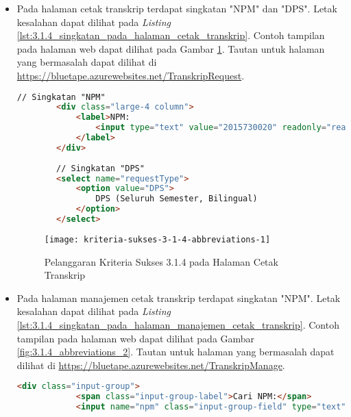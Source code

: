 \begin{itemize}
    \item Pada halaman cetak transkrip terdapat singkatan "NPM" dan "DPS". Letak kesalahan dapat dilihat pada \textit{Listing} \ref{lst:3.1.4_singkatan_pada_halaman_cetak_transkrip}. Contoh tampilan pada halaman web dapat dilihat pada Gambar \ref{fig:3.1.4_abbreviations_1}. Tautan untuk halaman yang bermasalah dapat dilihat di \url{https://bluetape.azurewebsites.net/TranskripRequest}.
    \begin{lstlisting}[frame=single, label={lst:3.1.4_singkatan_pada_halaman_cetak_transkrip}, language=HTML, caption=Pelanggaran Kriteria Sukses 3.1.4 pada Halaman Cetak Transkrip]
        // Singkatan "NPM"
        <div class="large-4 column">
            <label>NPM:
                <input type="text" value="2015730020" readonly="readonly"/>
            </label>
        </div>
        
        // Singkatan "DPS"
        <select name="requestType">
            <option value="DPS">
                DPS (Seluruh Semester, Bilingual)
            </option>
        </select>
    \end{lstlisting}

    \begin{figure}[H]
        \centering  
        \texttt{[image: kriteria-sukses-3-1-4-abbreviations-1]}  
        \caption[Pelanggaran Kriteria Sukses 3.1.4 pada Halaman Cetak Transkrip]{Pelanggaran Kriteria Sukses 3.1.4 pada Halaman Cetak Transkrip}
        \label{fig:3.1.4_abbreviations_1}  
    \end{figure}

    \item Pada halaman manajemen cetak transkrip terdapat singkatan "NPM". Letak kesalahan dapat dilihat pada \textit{Listing} \ref{lst:3.1.4_singkatan_pada_halaman_manajemen_cetak_transkrip}. Contoh tampilan pada halaman web dapat dilihat pada Gambar \ref{fig:3.1.4_abbreviations_2}. Tautan untuk halaman yang bermasalah dapat dilihat di \url{https://bluetape.azurewebsites.net/TranskripManage}.
    \begin{lstlisting}[frame=single, label={lst:3.1.4_singkatan_pada_halaman_manajemen_cetak_transkrip}, language=HTML, caption=Pelanggaran Kriteria Sukses 3.1.4 pada Halaman Manajemen Cetak Transkrip]
        <div class="input-group">
            <span class="input-group-label">Cari NPM:</span>
            <input name="npm" class="input-group-field" type="text" placeholder="2013730013" maxlength="10" minlength="10"/>
    \end{lstlisting}


\end{itemize}
